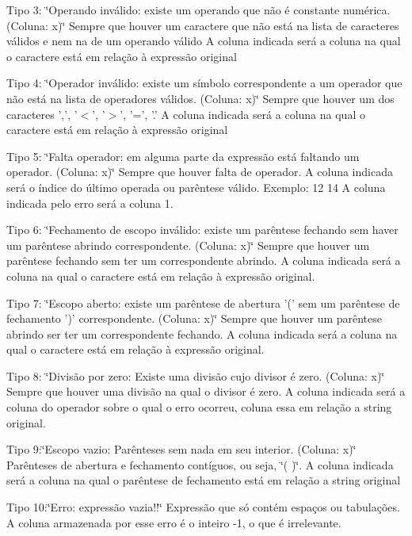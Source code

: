 Tipo 3\-: \char`\"{}\-Operando inválido\-: existe um operando que não é constante numérica. (\-Coluna\-: x)\char`\"{} Sempre que houver um caractere que não está na lista de caracteres válidos e nem na de um operando válido A coluna indicada será a coluna na qual o caractere está em relação à expressão original

Tipo 4\-: \char`\"{}\-Operador inválido\-: existe um símbolo correspondente a um operador que não está na lista de operadores válidos. (\-Coluna\-: x)\char`\"{} Sempre que houver um dos caracteres ',', '$<$', '$>$', '=', '.' A coluna indicada será a coluna na qual o caractere está em relação à expressão original

Tipo 5\-: \char`\"{}\-Falta operador\-: em alguma parte da expressão está faltando um operador. (\-Coluna\-: x)\char`\"{} Sempre que houver falta de operador. A coluna indicada será o índice do último operada ou parêntese válido. Exemplo\-: 12 14 A coluna indicada pelo erro será a coluna 1.

Tipo 6\-: \char`\"{}\-Fechamento de escopo inválido\-: existe um parêntese fechando sem haver um parêntese abrindo correspondente. (\-Coluna\-: x)\char`\"{} Sempre que houver um parêntese fechando sem ter um correspondente abrindo. A coluna indicada será a coluna na qual o caractere está em relação à expressão original.

Tipo 7\-: \char`\"{}\-Escopo aberto\-: existe um parêntese de abertura '(' sem um parêntese de fechamento ')' correspondente. (\-Coluna\-: x)\char`\"{} Sempre que houver um parêntese abrindo ser ter um correspondente fechando. A coluna indicada será a coluna na qual o caractere está em relação à expressão original.

Tipo 8\-: \char`\"{}\-Divisão por zero\-: Existe uma divisão cujo divisor é zero. (\-Coluna\-: x)\char`\"{} Sempre que houver uma divisão na qual o divisor é zero. A coluna indicada será a coluna do operador sobre o qual o erro ocorreu, coluna essa em relação a string original.

Tipo 9\-:\char`\"{}\-Escopo vazio\-: Parênteses sem nada em seu interior. (\-Coluna\-: x)\char`\"{} Parênteses de abertura e fechamento contíguos, ou seja, \char`\"{}( )\char`\"{}. A coluna indicada será a coluna na qual o parêntese de fechamento está em relação a string original

Tipo 10\-:\char`\"{}\-Erro\-: expressão vazia!!\char`\"{} Expressão que só contém espaços ou tabulações. A coluna armazenada por esse erro é o inteiro -\/1, o que é irrelevante. 

